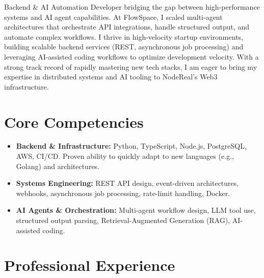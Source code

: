 \documentclass[11pt,a4paper,sans]{moderncv}
\begin{document}
\makecvtitle

Backend \& AI Automation Developer bridging the gap between high-performance systems and AI agent capabilities. At FlowSpace, I scaled multi-agent architectures that orchestrate API integrations, handle structured output, and automate complex workflows. I thrive in high-velocity startup environments, building scalable backend services (REST, asynchronous job processing) and leveraging AI-assisted coding workflows to optimize development velocity. With a strong track record of rapidly mastering new tech stacks, I am eager to bring my expertise in distributed systems and AI tooling to NodeReal's Web3 infrastructure.

\section{Core Competencies}
\begin{itemize}
\item \textbf{Backend \& Infrastructure:} Python, TypeScript, Node.js, PostgreSQL, AWS, CI/CD. Proven ability to quickly adapt to new languages (e.g., Golang) and architectures.
\item \textbf{Systems Engineering:} REST API design, event-driven architectures, webhooks, asynchronous job processing, rate-limit handling, Docker.
\item \textbf{AI Agents \& Orchestration:} Multi-agent workflow design, LLM tool use, structured output parsing, Retrieval-Augmented Generation (RAG), AI-assisted coding.
\end{itemize}

\section{Professional Experience}
\end{document}
